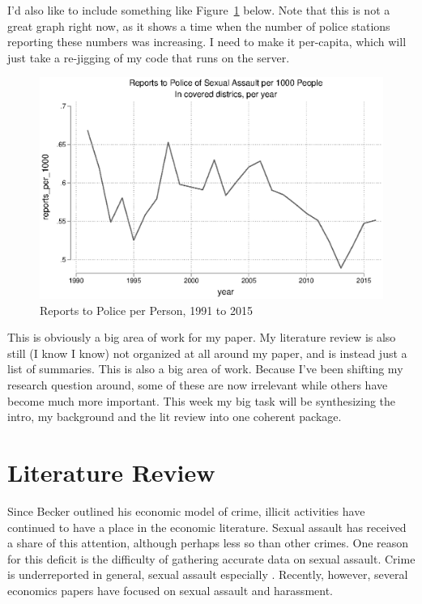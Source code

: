 \documentclass[AER,draftmode]{AEA}
\begin{document}
I'd also like to include something like Figure~\ref{figure:police_yearly} below. Note that this is not a great graph right now, as it shows a time when the number of police stations reporting these numbers was increasing. I need to make it per-capita, which will just take a re-jigging of my code that runs on the server. 

\begin{figure}

\includegraphics[width=\linewidth]{figures/police_yearly_reports.eps}

\caption{Reports to Police per Person, 1991 to 2015} \label{figure:police_yearly}
\end{figure}


This is obviously a big area of work for my paper. My literature review is also still (I know I know) not organized at all around my paper, and is instead just a list of summaries. This is also a big area of work. Because I've been shifting my research question around, some of these are now irrelevant while others have become much more important. This week my big task will be synthesizing the intro, my background and the lit review into one coherent package.

\section{Literature Review}
Since Becker outlined his economic model of crime, illicit activities have continued to have a place in the economic literature. Sexual assault has received a share of this attention, although perhaps less so than other crimes. One reason for this deficit is the difficulty of gathering accurate data on sexual assault. Crime is underreported in general, sexual assault especially \cite{kilpatrick_drug-facilitated_2007} \cite{fisher_sexual_2000}. Recently, however, several economics papers have focused on sexual assault and harassment. 
\end{document}
